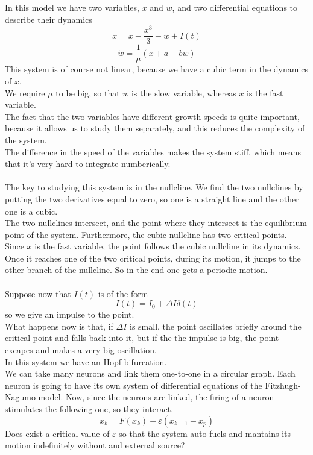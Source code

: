In this model we have two variables, $x$ and $w$, and two differential equations to describe their dynamics
$$
	\dot{x} = x - \frac{x^3}{3} - w + I(t)
$$
$$
	\dot{w} = \frac{1}{\mu}(x+a-bw)
$$
This system is of course not linear, because we have a cubic term in the dynamics of $x$. \\
We require $\mu$ to be big, so that $w$ is the slow variable, whereas $x$ is the fast variable. \\
The fact that the two variables have different growth speeds is quite important, because it allows us to study them separately, and this reduces the complexity of the system. \\
The difference in the speed of the variables makes the system stiff, which means that it's very hard to integrate numberically. \\ \\
The key to studying this system is in the nullcline. We find the two nullclines by putting the two derivatives equal to zero, so one is a straight line and the other one is a cubic. \\
The two nullclines intersect, and the point where they intersect is the equilibrium point of the system. Furthermore, the cubic nullcline has two critical points. Since $x$ is the fast variable, the point follows the cubic nullcline in its dynamics. Once it reaches one of the two critical points, during its motion, it jumps to the other branch of the nullcline. So in the end one gets a periodic motion. \\ \\
Suppose now that $I(t)$ is of the form
$$
	I(t) = I_0 + \Delta I \delta(t)
$$	
so we give an impulse to the point. \\
What happens now is that, if $\Delta I$ is small, the point oscillates briefly around the critical point and falls back into it, but if the the impulse is big, the point excapes and makes a very big oscillation. \\
In this system we have an Hopf bifurcation. \\

We can take many neurons and link them one-to-one in a circular graph. Each neuron is going to have its own system of differential equations of the Fitzhugh-Nagumo model. Now, since the neurons are linked, the firing of a neuron stimulates the following one, so they interact.
$$
	\dot{x_k} = F(x_k) + \varepsilon(x_{k-1}-x_p)
$$
Does exist a critical value of $\varepsilon$ so that the system auto-fuels and mantains its motion indefinitely without and external source?
